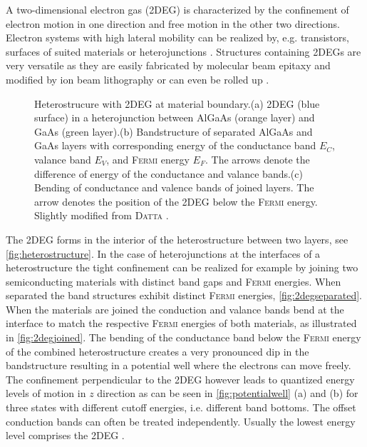 A two-dimensional electron gas (2DEG) is characterized by the confinement of electron motion in one direction and free motion in the other two directions. 
Electron systems with high lateral mobility can be realized by, e.g. transistors, surfaces of suited materials \cite{PhysRevLett.12.271} or heterojunctions \cite{JVSTB.4.853}. Structures containing 2DEGs are very versatile as they are easily fabricated by molecular beam epitaxy and modified by ion beam litho\-graphy \cite{Ingram1995}\cite{Nowack2009Thesis} or can even be rolled up \cite{Vorob'ev2004171}. 
\begin{figure}[!h]
\centering
{} \quad\quad
{} \quad\quad
{}
\caption{Heterostrucure with 2DEG at material boundary.(a) 2DEG (blue surface) in a heterojunction between AlGaAs (orange layer) and GaAs (green layer).(b) Bandstructure of separated AlGaAs and GaAs layers with corresponding energy of the conductance band $E_C$, valance band $E_V$, and \textsc{Fermi} energy $E_F$. The arrows denote the difference of energy of the conductance and valance bands.(c) Bending of conductance and valence bands of joined layers. The arrow denotes the position of the 2DEG below the \textsc{Fermi} energy. Slightly modified from \textsc{Datta} \cite{Datta1997}.}
\label{fig:hetero2deg}
\end{figure}
The 2DEG forms in the interior of the heterostructure between two layers, see \cref{fig:heterostructure}. In the case of heterojunctions at the interfaces of a heterostructure the tight confinement can be realized for example by joining two semiconducting materials with distinct band gaps and \textsc{Fermi} energies. When separated the band structures exhibit distinct \textsc{Fermi} energies, \cref{fig:2degseparated}. When the materials are joined the conduction and valance bands bend at the interface to match the respective \textsc{Fermi} energies of both materials, as illustrated in \cref{fig:2degjoined}.
The bending of the conductance band below the \textsc{Fermi} energy of the combined heterostructure creates a very pronounced dip in the bandstructure resulting in a potential well where the electrons can move freely. The confinement perpendicular to the 2DEG however leads to quantized energy levels of motion in $z$ direction as can be seen in \cref{fig:potentialwell} (a) and (b) for three states with different cutoff energies, i.e. different band bottoms. The offset conduction bands can often be treated independently. Usually the lowest energy level comprises the 2DEG \cite{Datta1997}.
